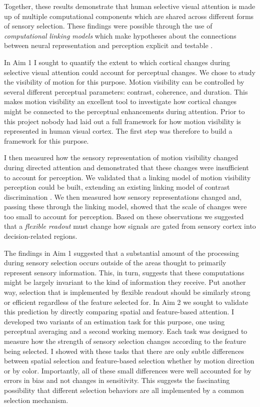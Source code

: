 

Together, these results demonstrate that human selective visual attention is made up of multiple computational components which are shared across different forms of sensory selection. These findings were possible through the use of \textit{computational linking models} which make hypotheses about the connections between neural representation and perception explicit and testable \citep{Barlow1972-kz,Brindley1960-gq,Cohen2010-xs,Newsome1989-fr,Pestilli2011-gi,Hara2014-mv,Gardner2015-bd}.

In Aim 1 I sought to quantify the extent to which cortical changes during selective visual attention could account for perceptual changes. We chose to study the visibility of motion for this purpose. Motion visibility can be controlled by several different perceptual parameters: contrast, coherence, and duration. This makes motion visibility an excellent tool to investigate how cortical changes might be connected to the perceptual enhancements during attention. Prior to this project nobody had laid out a full framework for how motion visibility is represented in human visual cortex. The first step was therefore to build a framework for this purpose. 

I then measured how the sensory representation of motion visibility changed during directed attention and demonstrated that these changes were insufficient to account for perception. We validated that a linking model of motion visibility perception could be built, extending an existing linking model of contrast discrimination \citep{Boynton1999-jd}. We then measured how sensory representations changed and, passing these through the linking model, showed that the scale of changes were too small to account for perception. Based on these observations we suggested that a \textit{flexible readout} must change how signals are gated from sensory cortex into decision-related regions.

The findings in Aim 1 suggested that a substantial amount of the processing during sensory selection occurs outside of the areas thought to primarily represent sensory information. This, in turn, suggests that these computations might be largely invariant to the kind of information they receive. Put another way, selection that is implemented by flexible readout should be similarly strong or efficient regardless of the feature selected for. In Aim 2 we sought to validate this prediction by directly comparing spatial and feature-based attention. I developed two variants of an estimation task for this purpose, one using perceptual averaging and a second working memory. Each task was designed to measure how the strength of sensory selection changes according to the feature being selected. I showed with these tasks that there are only subtle differences between spatial selection and feature-based selection whether by motion direction or by color. Importantly, all of these small differences were well accounted for by errors in bias and not changes in sensitivity. This suggests the fascinating possibility that different selection behaviors are all implemented by a common selection mechanism. 

